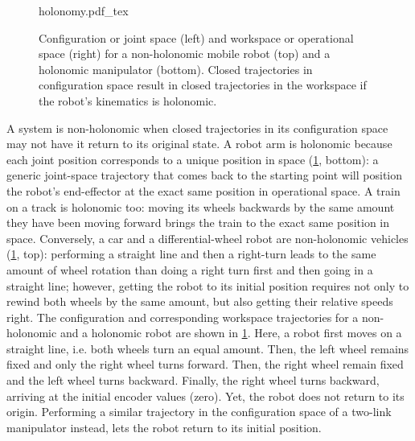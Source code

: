 \begin{figure}[!t]
    \small
    \centering
    \def\svgwidth{\textwidth}
    {holonomy.pdf_tex}
    \caption{Configuration or joint space (left) and workspace or operational space (right) for a non-holonomic mobile robot (top) and a holonomic manipulator (bottom). Closed trajectories in configuration space result in closed trajectories in the workspace if the robot's kinematics is holonomic.}
    \label{fig:holonomy}
\end{figure}

A system is non-holonomic when closed trajectories in its configuration space may not have it return to its original state.
A robot arm is holonomic because each joint position corresponds to a unique position in space (\cref{fig:holonomy}, bottom):
a generic joint-space trajectory that comes back to the starting point will position the robot's end-effector at the exact same position in operational space.
A train on a track is holonomic too: moving its wheels backwards by the same amount they have been moving forward brings the train to the exact same position in space.
Conversely, a car and a differential-wheel robot are non-holonomic vehicles (\cref{fig:holonomy}, top): performing a straight line and then a right-turn leads to the same amount of wheel rotation than doing a right turn first and then going in a straight line; however, getting the robot to its initial position requires not only to rewind both wheels by the same amount, but also getting their relative speeds right.
The configuration and corresponding workspace trajectories for a non-holonomic and a holonomic robot are shown in \cref{fig:holonomy}.
Here, a robot first moves on a straight line, i.e. both wheels turn an equal amount.
Then, the left wheel remains fixed and only the right wheel turns forward.
Then, the right wheel remain fixed and the left wheel turns backward.
Finally, the right wheel turns backward, arriving at the initial encoder values (zero).
Yet, the robot does not return to its origin. Performing a similar trajectory in the configuration space of a two-link manipulator instead, lets the robot return to its initial position.

